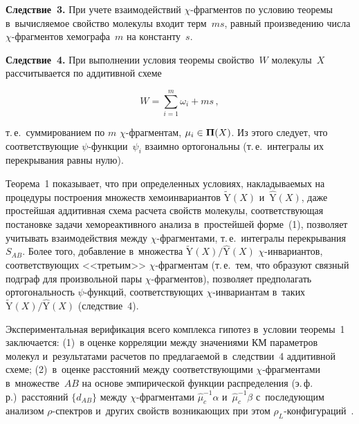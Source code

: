 \begin{multicols}{2}
     \vspace*{2pt}
     
     
\noindent
\textbf{Следствие~3.} При учете взаимодействий $\chi$-фраг\-мен\-тов по 
условию теоремы в~вычисляемое свойство молекулы входит терм~$ms$, 
равный произведению числа $\chi$-фраг\-мен\-тов хемографа~$m$ на 
константу~$s$. 
     
          \vspace*{2pt}
     
     
\noindent
\textbf{Следствие~4.} При выполнении условия теоремы свойство~$W$ 
молекулы~$X$ рассчитывается по аддитивной схеме 


\noindent
$$
W=\sum\limits_{i=1}^m \omega_i+ ms\,,
$$

\vspace*{-2pt}

\noindent
 т.\,е.\ суммированием по $m$  
$\chi$-фраг\-мен\-там, $\mu_i\hm\in \bm{\Pi}(X)$. Из этого следует, что 
соответствующие $\psi$-функ\-ции~$\psi_i$ взаимно ортогональны (т.\,е.\ 
интегралы их перекрывания равны нулю).
    
\smallskip

Теорема~1 показывает, что при определенных условиях, накладываемых на 
процедуры по\-стро\-ения множеств хемоинвариантов $\tilde{\mathrm{Y}}({X})$ 
и~$\hat{\mathrm{Y}}({X})$, даже %
простейшая аддитивная схема 
расчета свойств молекулы, соответствующая постановке задачи 
хемореактивного анализа в~простейшей форме~(1),\linebreak 
позволяет учитывать 
взаимодействия между \mbox{$\chi$-фраг}\-мен\-та\-ми, т.\,е.\ интегралы 
перекрывания~${S}_{AB}$. Более того, добавление 
в~множества $\tilde{\mathrm{Y}}({X})/\hat{\mathrm{Y}}({X})$ 
\mbox{$\chi$-ин}\-ва\-ри\-ан\-тов, соответствующих <<третьим>> \mbox{$\chi$-фраг}\-мен\-там 
(т.\,е.\ тем, что образуют связный подграф для произвольной пары  
\mbox{$\chi$-фраг}\-мен\-тов), позволяет предполагать ортогональность  
\mbox{$\psi$-функ}\-ций, соответствующих \mbox{$\chi$-ин}\-ва\-ри\-ан\-там в~таких  
$\tilde{\mathrm{Y}}({X})/\hat{\mathrm{Y}}({X})$ 
(следствие~4).
     
     Экспериментальная верификация всего комплекса гипотез в~условии  
тео\-ре\-мы~1 заключается: (1)~в оценке корреляции между значениями КМ 
параметров молекул и~результатами \mbox{расчетов} по предлагаемой в~следствии~4 
аддитивной схеме; (2)~в~оценке расстояний между соответствующими  
\mbox{$\chi$-фраг}\-мен\-та\-ми в~множестве~$AB$ на основе эмпирической функции 
распределения (э.\,ф.\,р.)\ рас\-сто\-яний $\{d_{AB}\}$ между  
$\chi$-фраг\-мен\-та\-ми $\hat{\mu}^{-1}_c\alpha$ и~$\hat{\mu}_c^{-1}\beta$ 
с~по\-сле\-ду\-ющим анализом $\rho$-спект\-ров и~других свойств возникающих 
при этом  $\rho_L$-кон\-фи\-гу\-ра\-ций~\cite{1-tor}. 
     

\end{multicols}

